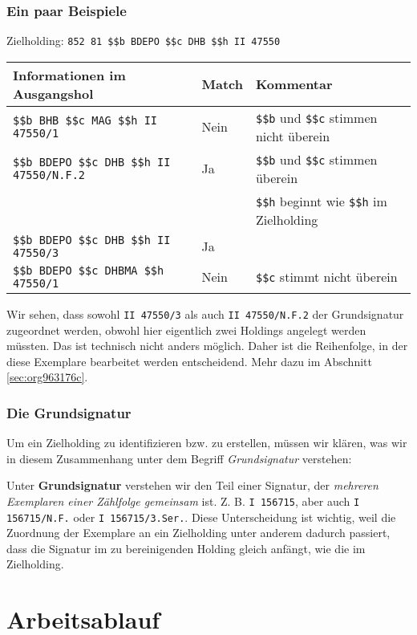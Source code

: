 \documentclass[10pt, a4paper]{scrartcl}
\begin{document}
\subsubsection{Ein paar Beispiele}
\label{sec:org4ec2135}
Zielholding: \texttt{852 81 \$\$b BDEPO \$\$c DHB \$\$h II 47550}

\begin{center}
\begin{tabular}{lll}
Informationen im Ausgangshol & Match & Kommentar\\
\hline
\texttt{\$\$b BHB \$\$c MAG \$\$h II 47550/1} & Nein & \texttt{\$\$b} und \texttt{\$\$c} stimmen nicht überein\\
\texttt{\$\$b BDEPO \$\$c DHB \$\$h II 47550/N.F.2} & Ja & \texttt{\$\$b} und \texttt{\$\$c} stimmen überein\\
 &  & \texttt{\$\$h} beginnt wie \texttt{\$\$h} im Zielholding\\
\texttt{\$\$b BDEPO \$\$c DHB \$\$h II 47550/3} & Ja & \\
\texttt{\$\$b BDEPO \$\$c DHBMA \$\$h 47550/1} & Nein & \texttt{\$\$c} stimmt nicht überein\\
\end{tabular}
\end{center}

Wir sehen, dass sowohl \texttt{II 47550/3} als auch \texttt{II 47550/N.F.2} der
Grundsignatur zugeordnet werden, obwohl hier eigentlich zwei Holdings
angelegt werden müssten. Das ist technisch nicht anders möglich. Daher
ist die Reihenfolge, in der diese Exemplare bearbeitet werden
entscheidend. Mehr dazu im Abschnitt \ref{sec:org963176c}.



\subsubsection{Die Grundsignatur}
\label{sec:org9cf4c48}
Um ein Zielholding zu identifizieren bzw. zu erstellen, müssen wir klären,
was wir in diesem Zusammenhang unter dem Begriff \emph{Grundsignatur} verstehen:

Unter \textbf{Grundsignatur} verstehen wir den Teil einer Signatur, der \emph{mehreren
Exemplaren einer Zählfolge gemeinsam} ist. Z. B. \texttt{I 156715}, aber auch \texttt{I
        156715/N.F.} oder \texttt{I 156715/3.Ser.}. Diese Unterscheidung ist wichtig, weil
die Zuordnung der Exemplare an ein Zielholding unter anderem dadurch
passiert, dass die Signatur im zu bereinigenden Holding gleich anfängt, wie
die im Zielholding.
\section{Arbeitsablauf}
\label{sec:org6b00836}
\end{document}
